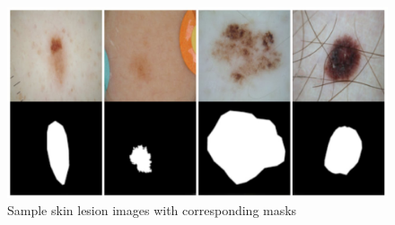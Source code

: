 \begin{figure}
    \centerline{\includegraphics[width=1\columnwidth]{02-related-works/figures/sample-medical-images-with-masks.jpeg}}
    \caption{ Sample skin lesion images with corresponding masks }
    \label{figure:sample-medical-images-with-masks}
\end{figure}